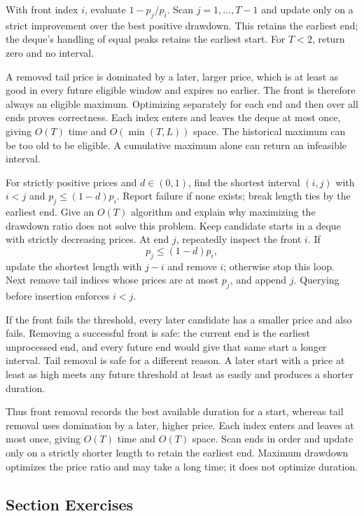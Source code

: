 With front index $i$, evaluate $1-p_j/p_i$. Scan $j=1,\ldots,T-1$ and update only on a strict improvement over the best positive drawdown. This retains the earliest end; the deque's handling of equal peaks retains the earliest start. For $T<2$, return zero and no interval.

A removed tail price is dominated by a later, larger price, which is at least as good in every future eligible window and expires no earlier. The front is therefore always an eligible maximum. Optimizing separately for each end and then over all ends proves correctness. Each index enters and leaves the deque at most once, giving $O(T)$ time and $O(\min(T,L))$ space.
\pitfall The historical maximum can be too old to be eligible. A cumulative maximum alone can return an infeasible interval.

For strictly positive prices and $d\in(0,1)$, find the shortest interval $(i,j)$ with $i<j$ and $p_j\le(1-d)p_i$. Report failure if none exists; break length ties by the earliest end. Give an $O(T)$ algorithm and explain why maximizing the drawdown ratio does not solve this problem.
\solution Keep candidate starts in a deque with strictly decreasing prices. At end $j$, repeatedly inspect the front $i$. If
\[
p_j\le(1-d)p_i,
\]
update the shortest length with $j-i$ and remove $i$; otherwise stop this loop. Next remove tail indices whose prices are at most $p_j$, and append $j$. Querying before insertion enforces $i<j$.

If the front fails the threshold, every later candidate has a smaller price and also fails. Removing a successful front is safe: the current end is the earliest unprocessed end, and every future end would give that same start a longer interval. Tail removal is safe for a different reason. A later start with a price at least as high meets any future threshold at least as easily and produces a shorter duration.

Thus front removal records the best available duration for a start, whereas tail removal uses domination by a later, higher price. Each index enters and leaves at most once, giving $O(T)$ time and $O(T)$ space. Scan ends in order and update only on a strictly shorter length to retain the earliest end. Maximum drawdown optimizes the price ratio and may take a long time; it does not optimize duration.

\par{}
\subsection*{Section Exercises}



